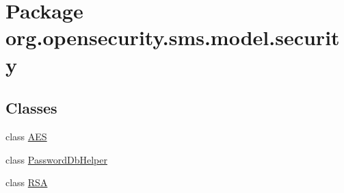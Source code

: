 \hypertarget{a00040}{\section{Package org.\+opensecurity.\+sms.\+model.\+security}
\label{a00040}
}
\subsection*{Classes}
\begin{DoxyCompactItemize}
\item 
class \hyperlink{a00001}{A\+E\+S}
\item 
class \hyperlink{a00012}{Password\+Db\+Helper}
\item 
class \hyperlink{a00014}{R\+S\+A}
\end{DoxyCompactItemize}
